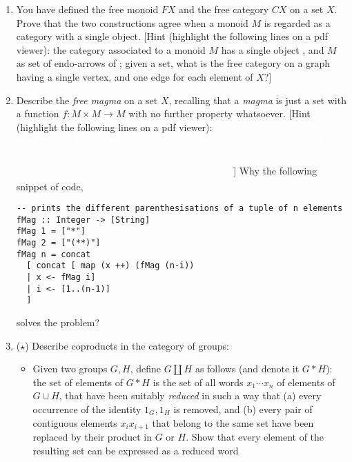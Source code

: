 \documentclass[11pt]{article}
\begin{document}
\begin{enumerate}
	      Show that the set of functions \(a : A\sqcup 1\to A\) such that the following diagrams commute
	      \[
		      \vcenter{\xymatrix{
				      A \ar[r]^{i_A}\ar@{=}[dr]& A \sqcup 1 \ar[d]^a & A\sqcup 1\sqcup 1\ar[r]^{A\sqcup\fold}\ar[d]_{a\sqcup 1} & A\sqcup 1\ar[d]^a \\
				      & A & A\sqcup 1\ar[r]_a & A
			      }} \]
				is in bijection with the elements of \(A\); namely, each such \(a : A\sqcup 1 \to A\) determines a unique element \(a_0 : A\).
  \item You have defined the free monoid $FX$ and the free category $CX$ on a set $X$. Prove that the two constructions agree when a monoid $M$ is regarded as a category with a single object. [Hint (highlight the following lines on a pdf viewer): {\color{white} the category associated to a monoid $M$ has a single object , and $M$ as set of endo-arrows of ; given a set, what is the free category on a graph having a single vertex, and one edge for each element of $X$?}]
	\item Describe the \emph{free magma} on a set $X$, recalling that a \emph{magma} is just a set with a function $f : M \times M \to M$ with no further property whatsoever. [Hint (highlight the following lines on a pdf viewer): \textcolor{white}{use a recursive definition: starting from the set $M_1 = X$, add all parenthesisations of elements of $X$, i.e. form the set $M_n := \sum_{p=1}^{n-1} M_p \times M_{n-p}$; define an operation on $FX := \coprod_{n\ge 0} M_n$ and prove the universal property.}]
	Why the following snippet of code,
	\begin{verbatim}
-- prints the different parenthesisations of a tuple of n elements
fMag :: Integer -> [String]
fMag 1 = ["*"]
fMag 2 = ["(**)"]
fMag n = concat 
  [ concat [ map (x ++) (fMag (n-i)) 
  | x <- fMag i]
  | i <- [1..(n-1)]
  ]
	\end{verbatim}
	solves the problem?
	\item (\(\star\)) Describe coproducts in the category of groups:
	      \begin{itemize}
		      \item Given two groups \(G,H\), define \(G\coprod H\) as follows (and denote it $G*H$): the set of elements of \(G *H\) is the set of all words \(x_1\cdots x_n\) of elements of \(G \cup H\), that have been suitably \emph{reduced} in such a way that (a) every occurrence of the identity \(1_G, 1_H\) is removed, and (b) every pair of contiguous elements \(x_ix_{i+1}\) that belong to the same set have been replaced by their product in \(G\) or \(H\). Show that every element of the resulting set can be expressed as a reduced word

\end{itemize}
\end{enumerate}
\end{document}
